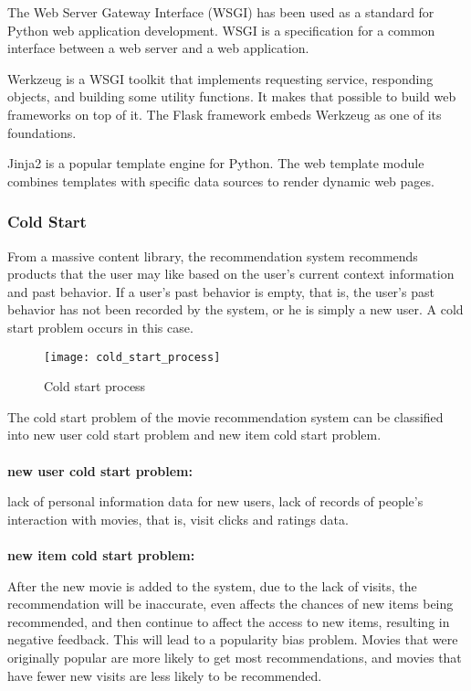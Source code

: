 \par The Web Server Gateway Interface (WSGI) has been used as a standard for Python web application development. WSGI is a specification for a common interface between a web server and a web application.
\par Werkzeug is a WSGI toolkit that implements requesting service, responding objects, and building some utility functions. It makes that possible to build web frameworks on top of it. The Flask framework embeds Werkzeug as one of its foundations.
\par Jinja2 is a popular template engine for Python. The web template module combines templates with specific data sources to render dynamic web pages.

\subsubsection{Cold Start}
From a massive content library, the recommendation system recommends products that the user may like based on the user's current context information and past behavior. If a user's past behavior is empty, that is, the user's past behavior has not been recorded by the system, or he is simply a new user. A cold start problem occurs in this case.
\begin{figure}[h]
\caption{Cold start process}
\centering
\texttt{[image: cold\_start\_process]}
\end{figure}
\par The cold start problem of the movie recommendation system can be classified into new user cold start problem and new item cold start problem.
\\
\\
\textbf{new user cold start problem: }
\par lack of personal information data for new users, lack of records of people's interaction with movies, that is, visit clicks and ratings data.
\\
\\
\textbf{new item cold start problem: }
\par After the new movie is added to the system, due to the lack of visits, the recommendation will be inaccurate, even affects the chances of new items being recommended, and then continue to affect the access to new items, resulting in negative feedback. This will lead to a popularity bias problem. Movies that were originally popular are more likely to get most recommendations, and movies that have fewer new visits are less likely to be recommended.
